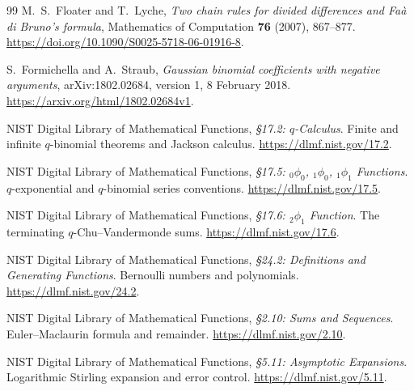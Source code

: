 \documentclass[11pt,a4paper]{article}
\numberwithin{equation}{section}
\theoremstyle{definition}
\theoremstyle{remark}
\begin{document}
\begin{thebibliography}{99}
M.~S.~Floater and T.~Lyche,
\emph{Two chain rules for divided differences and Fa\`a di Bruno's formula},
Mathematics of Computation \textbf{76} (2007), 867--877.
\url{https://doi.org/10.1090/S0025-5718-06-01916-8}.

S.~Formichella and A.~Straub,
\emph{Gaussian binomial coefficients with negative arguments},
arXiv:1802.02684, version 1, 8 February 2018.
\url{https://arxiv.org/html/1802.02684v1}.

NIST Digital Library of Mathematical Functions,
\emph{\S17.2: $q$-Calculus}.
Finite and infinite $q$-binomial theorems and Jackson calculus.
\url{https://dlmf.nist.gov/17.2}.

NIST Digital Library of Mathematical Functions,
\emph{\S17.5: ${}_0\phi_0$, ${}_1\phi_0$, ${}_1\phi_1$ Functions}.
$q$-exponential and $q$-binomial series conventions.
\url{https://dlmf.nist.gov/17.5}.

NIST Digital Library of Mathematical Functions,
\emph{\S17.6: ${}_2\phi_1$ Function}.
The terminating $q$-Chu--Vandermonde sums.
\url{https://dlmf.nist.gov/17.6}.

NIST Digital Library of Mathematical Functions,
\emph{\S24.2: Definitions and Generating Functions}.
Bernoulli numbers and polynomials.
\url{https://dlmf.nist.gov/24.2}.

NIST Digital Library of Mathematical Functions,
\emph{\S2.10: Sums and Sequences}.
Euler--Maclaurin formula and remainder.
\url{https://dlmf.nist.gov/2.10}.

NIST Digital Library of Mathematical Functions,
\emph{\S5.11: Asymptotic Expansions}.
Logarithmic Stirling expansion and error control.
\url{https://dlmf.nist.gov/5.11}.

\end{thebibliography}
\end{document}
